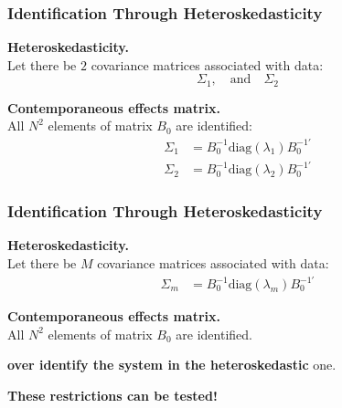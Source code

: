 \documentclass[notes,blackandwhite,mathsans,usenames,dvipsnames]{beamer}
\begin{document}
\begin{frame}
	\frametitle{Identification Through Heteroskedasticity}

\textbf{Heteroskedasticity.}\\
{\color{mcxs2}Let there be} $2$ {\color{mcxs2}covariance matrices associated with data:}
$$ \Sigma_1,\quad\text{and}\quad\Sigma_2 $$

\bigskip\textbf{Contemporaneous effects matrix.}\\
{\color{mcxs2}All} $N^2$ {\color{mcxs2}elements of matrix} $B_0$ {\color{mcxs2}are identified:}
\begin{align*}
\Sigma_1 &= B_0^{-1}\text{diag}(\lambda_1)B_0^{-1'}\\
\Sigma_2 &= B_0^{-1}\text{diag}(\lambda_2)B_0^{-1'}
\end{align*}
\end{frame}





\begin{frame}
	\frametitle{Identification Through Heteroskedasticity}

\textbf{Heteroskedasticity.}\\
{\color{mcxs2}Let there be} $M$ {\color{mcxs2}covariance matrices associated with data:}
\begin{align*}
\Sigma_m &= B_0^{-1}\text{diag}(\lambda_m)B_0^{-1'}
\end{align*}


\bigskip\textbf{Contemporaneous effects matrix.}\\
{\color{mcxs2}All} $N^2$ {\color{mcxs2}elements of matrix} $B_0$ {\color{mcxs2}are identified.}

 \textbf{\color{purple}over identify the system in the heteroskedastic} {\color{mcxs2}one.}

\bigskip
\textbf{\color{purple}These restrictions can be tested!}

\end{frame}
\end{document}
